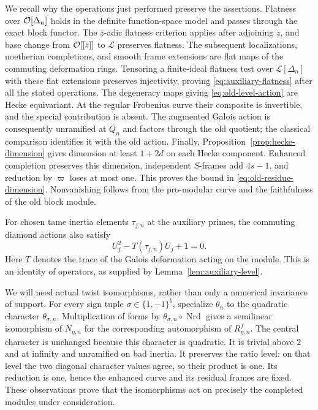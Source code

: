 We recall why the operations just performed preserve the assertions.
Flatness over $\mathcal O[\Delta_n]$ holds in the definite function-space
model and passes through the exact block functor.  The $z$-adic
flatness criterion applies after adjoining $z$, and base change
from $\mathcal O[[z]]$ to $\mathcal L$ preserves flatness.
The subsequent localizations, noetherian completions, and smooth
frame extensions are flat maps of the commuting deformation rings.
Tensoring a finite-ideal flatness test over $\mathcal L[\Delta_n]$
with these flat extensions preserves injectivity, proving
\eqref{eq:auxiliary-flatness} after all the stated operations.
The degeneracy maps giving
\eqref{eq:old-level-action} are Hecke equivariant.  At the regular
Frobenius curve their composite is invertible, and the special
contribution is absent.  The augmented Galois action is consequently
unramified at $Q_n$ and factors through the old quotient; the
classical comparison identifies it with the old action.  Finally,
Proposition~\ref{prop:hecke-dimension} gives dimension at least
$1+2d$ on each Hecke component.  Enhanced completion preserves this
dimension, independent $S$-frames add $4s-1$, and reduction by
$\varpi$ loses at most one.  This proves the bound in
\eqref{eq:old-residue-dimension}.  Nonvanishing follows from the
pro-modular curve and the faithfulness of the old block module.

For chosen tame inertia elements $\tau_{j,n}$ at the auxiliary
primes, the commuting diamond actions also satisfy
\begin{equation}\label{eq:diamond-quadratic}
 U_j^2-T(\tau_{j,n})U_j+1=0.
\end{equation}
Here $T$ denotes the trace of the Galois deformation acting on the
module.  This is an identity of operators, as supplied by
Lemma~\ref{lem:auxiliary-level}.

We will need actual twist isomorphisms, rather than only a numerical
invariance of support.  For every sign tuple
$\sigma\in\{1,-1\}^b$, specialize $\theta_n$ to the quadratic
character $\theta_{\sigma,n}$.  Multiplication of forms by
$\theta_{\sigma,n}\circ\operatorname{Nrd}$ gives a semilinear
isomorphism of $N_{\eta,n}$ for the corresponding automorphism of
$R_{\eta,n}^f$.  The central character is unchanged because this
character is quadratic.  It is trivial above $2$ and at infinity
and unramified on bad inertia.  It preserves the ratio level: on
that level the two diagonal character values agree, so their
product is one.  Its reduction is one, hence the enhanced curve
and its residual frames are fixed.  These observations prove that
the isomorphisms act on precisely the completed modules under
consideration.


